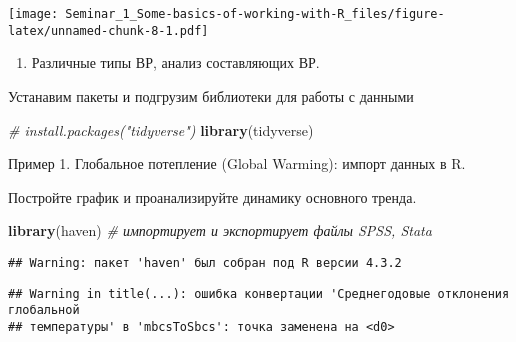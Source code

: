 \documentclass[
]{article}
\newenvironment{Shaded}{\begin{snugshade}}{\end{snugshade}}
\newcommand{\AttributeTok}[1]{\textcolor[rgb]{0.13,0.29,0.53}{#1}}
\newcommand{\CommentTok}[1]{\textcolor[rgb]{0.56,0.35,0.01}{\textit{#1}}}
\newcommand{\FunctionTok}[1]{\textcolor[rgb]{0.13,0.29,0.53}{\textbf{#1}}}
\newcommand{\NormalTok}[1]{#1}
\newcommand{\OtherTok}[1]{\textcolor[rgb]{0.56,0.35,0.01}{#1}}
\newcommand{\SpecialCharTok}[1]{\textcolor[rgb]{0.81,0.36,0.00}{\textbf{#1}}}
\newcommand{\StringTok}[1]{\textcolor[rgb]{0.31,0.60,0.02}{#1}}
\providecommand{\tightlist}{%
  \setlength{\itemsep}{0pt}\setlength{\parskip}{0pt}}
\begin{document}
\texttt{[image: Seminar\_1\_Some-basics-of-working-with-R\_files/figure-latex/unnamed-chunk-8-1.pdf]}

\begin{enumerate}
\def\labelenumi{\arabic{enumi}.}
\setcounter{enumi}{1}
\tightlist
\item
  Различные типы ВР, анализ составляющих ВР.
\end{enumerate}

Устанавим пакеты и подгрузим библиотеки для работы с данными

\begin{Shaded}
\begin{Highlighting}[]
\CommentTok{\# install.packages("tidyverse")}
\FunctionTok{library}\NormalTok{(tidyverse)}
\end{Highlighting}
\end{Shaded}

Пример 1. Глобальное потепление (Global Warming): импорт данных в R.

Постройте график и проанализируйте динамику основного тренда.

\begin{Shaded}
\begin{Highlighting}[]
\FunctionTok{library}\NormalTok{(haven) }\CommentTok{\# импортирует и экспортирует файлы SPSS, Stata}
\end{Highlighting}
\end{Shaded}

\begin{verbatim}
## Warning: пакет 'haven' был собран под R версии 4.3.2
\end{verbatim}

\begin{Shaded}
\end{Shaded}

\begin{verbatim}
## Warning in title(...): ошибка конвертации 'Среднегодовые отклонения глобальной
## температуры' в 'mbcsToSbcs': точка заменена на <d0>
\end{verbatim}
\end{document}
